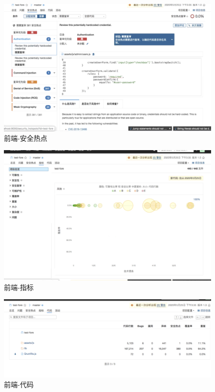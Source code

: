 \documentclass[hyperref, a4paper]{ctexart}
\begin{document}
\begin{figure}
\centering
\includegraphics{screenshots/lab7-pic/f-3.png}
\caption{前端-安全热点}
\end{figure}

\begin{figure}
\centering
\includegraphics{screenshots/lab7-pic/f-4.png}
\caption{前端-指标}
\end{figure}

\begin{figure}
\centering
\includegraphics{screenshots/lab7-pic/f-5.png}
\caption{前端-代码}
\end{figure}
\end{document}

